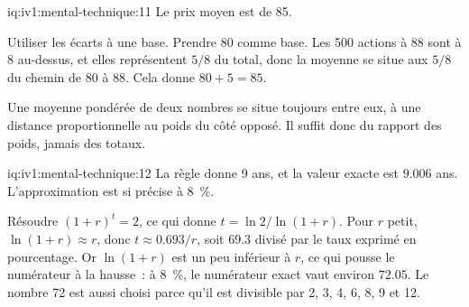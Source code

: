 \begin{solution}{iq:iv1:mental-technique:11}
Le prix moyen est de 85.

Utiliser les écarts à une base. Prendre 80 comme base. Les 500 actions à 88 sont à 8 au-dessus, et elles représentent $5/8$ du total, donc la moyenne se situe aux $5/8$ du chemin de 80 à 88. Cela donne $80 + 5 = 85$.

Une moyenne pondérée de deux nombres se situe toujours entre eux, à une distance proportionnelle au poids du côté opposé. Il suffit donc du rapport des poids, jamais des totaux.

\end{solution}

\begin{solution}{iq:iv1:mental-technique:12}
La règle donne 9 ans, et la valeur exacte est $9.006$ ans. L'approximation est si précise à 8~\%.

Résoudre $(1 + r)^t = 2$, ce qui donne $t = \ln 2 / \ln(1 + r)$. Pour $r$ petit, $\ln(1 + r) \approx r$, donc $t \approx 0.693/r$, soit $69.3$ divisé par le taux exprimé en pourcentage. Or $\ln(1 + r)$ est un peu inférieur à $r$, ce qui pousse le numérateur à la hausse~: à 8~\%, le numérateur exact vaut environ $72.05$. Le nombre 72 est aussi choisi parce qu'il est divisible par 2, 3, 4, 6, 8, 9 et 12.

\end{solution}

